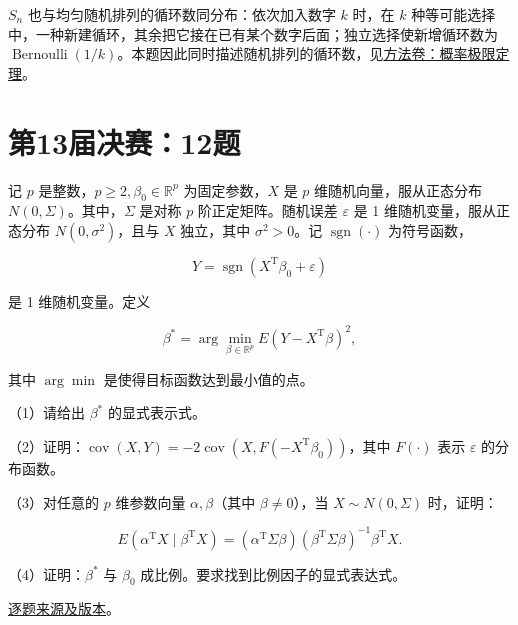 \begin{remark}[方法与条件]

$S_n$ 也与均匀随机排列的循环数同分布：依次加入数字 $k$ 时，在 $k$ 种等可能选择中，一种新建循环，其余把它接在已有某个数字后面；独立选择使新增循环数为 $\operatorname{Bernoulli}(1/k)$。本题因此同时描述随机排列的循环数，见\hyperref[app:probability-limit]{方法卷：概率极限定理}。

\end{remark}

\section{第13届决赛：12题}\label{pr:fin13-high:12}

\begin{example}[公开题解转录]\label{q:fin13-high:12}

记 $p$ 是整数，$p \geq 2, \beta_0\in\mathbb R^p$ 为固定参数，$X$ 是 $p$ 维随机向量，服从正态分布 $N(0, \Sigma)$。其中，$\Sigma$ 是对称 $p$ 阶正定矩阵。随机误差 $\varepsilon$ 是 1 维随机变量，服从正态分布 $N(0, \sigma^2)$，且与 $X$ 独立，其中 $\sigma^2 > 0$。记 $\operatorname{sgn}(\cdot)$ 为符号函数，

\[
Y = \operatorname{sgn}\left(X^{\mathrm{T}}\beta_0 + \varepsilon\right)
\]

是 1 维随机变量。定义

\[
\beta^* = \operatorname*{arg}\min_{\beta \in \mathbb{R}^p} E\left(Y - X^{\mathrm{T}}\beta\right)^2,
\]

其中 $\operatorname{arg}\min$ 是使得目标函数达到最小值的点。

（1）请给出 $\beta^*$ 的显式表示式。

（2）证明：$\operatorname{cov}(X, Y) = -2 \operatorname{cov}\left(X, F\left(-X^{\mathrm{T}}\beta_0\right)\right)$，其中 $F(\cdot)$ 表示 $\varepsilon$ 的分布函数。

（3）对任意的 $p$ 维参数向量 $\alpha, \beta$（其中 $\beta\ne0$），当 $X \sim N(0, \Sigma)$ 时，证明：

\[
E\left(\alpha^{\mathrm{T}}X \mid \beta^{\mathrm{T}}X\right) = \left(\alpha^{\mathrm{T}}\Sigma\beta\right)\left(\beta^{\mathrm{T}}\Sigma\beta\right)^{-1}\beta^{\mathrm{T}}X.
\]

（4）证明：$\beta^*$ 与 $\beta_0$ 成比例。要求找到比例因子的显式表达式。

\end{example}

\href{https://github.com/lzxcr/cmc-mathematics/blob/64916fa1fdbc3e444a652eca204d5669058ee321/src/problems/finals/13/15.md}{逐题来源及版本}。

